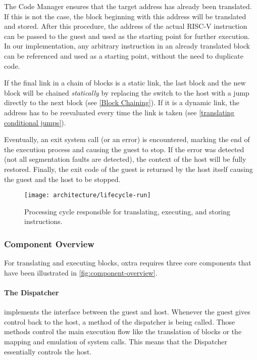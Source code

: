 		The Code Manager ensures that the target address has already been translated. If this is not the case, the block beginning with this address will be translated and stored. After this procedure, the address of the actual RISC-V instruction can be passed to the guest and used as the starting point for further execution. In our implementation, any arbitrary instruction in an already translated block can be referenced and used as a starting point, without the need to duplicate code. 
		
		If the final link in a chain of blocks is a static link, the last block and the new block will be chained \emph{statically} by replacing the switch to the host with a jump directly to the next block (see \ref{Block Chaining}). If it is a dynamic link, the address has to be reevaluated every time the link is taken (see \ref{translating conditional jumps}).
		
		Eventually, an exit system call (or an error) is encountered, marking the end of the execution process and causing the guest to stop. If the error was detected (not all segmentation faults are detected), the context of the host will be fully restored. Finally, the exit code of the guest is returned by the host itself causing the guest and the host to be stopped. 
		
		\begin{figure}[htb]
			\centering
			\texttt{[image: architecture/lifecycle-run]}
			\caption[Instruction Processing]{Processing cycle responsible for translating, executing, and storing instructions.}
			\label{fig:lifecycle-processing}
		\end{figure}
	
	\subsubsection{Component Overview}
		For translating and executing blocks, oxtra requires three core components that have been illustrated in \autoref{fig:component-overview}.
		
		\paragraph{The Dispatcher} implements the interface between the guest and host. Whenever the guest gives control back to the host, a method of the dispatcher is being called. Those methods control the main execution flow like the translation of blocks or the mapping and emulation of system calls. This means that the Dispatcher essentially controls the host.
		
